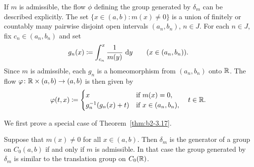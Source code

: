 \begin{remark}\label{rem:b2-3.17}
If\/ $m$ is admissible, the flow $\phi$ defining the group generated by $\delta_{m}$
can be described explicitly.
The set $\{x \in (a,b) : m(x) \neq 0\}$ is a union of finitely or countably many
pairwise disjoint open intervals $(a_{n},b_{n})$, $n \in J$.
For each $n \in J$, fix $c_{n} \in (a_{n},b_{n})$ and set
\[
    g_{n}(x) \coloneq \int_{c_{n}}^{x} \frac{1}{m(y)}\,\mathop{}\!\mathrm{d}{y} \qquad (x \in (a_{n},b_{n})).
\]
Since $m$ is admissible, each $g_{n}$ is a homeomorphism from $(a_{n},b_{n})$ onto $\mathbb{R}$.
The flow $\phi \colon \R \times (a,b) \to (a,b)$ is then given by
\begin{equation}\label{eq:b2-3.22}
    \phi(t,x) \coloneq \begin{cases}
        x                       & \text{if } m(x) = 0, \\
        g_{n}^{-1}(g_{n}(x)+t) & \text{if } x \in (a_{n},b_{n}),
    \end{cases}
    \quad t \in \R.
\end{equation}
\end{remark}
We first prove a special case of Theorem~\ref{thm:b2-3.17}.
\begin{proposition}\label{prop:b2-3.18}
%
Suppose that $m(x) \neq 0$ for all $x \in (a,b)$.
Then $\delta_{m}$ is the generator of a group on $C_{0}(a,b)$ if and only if\/ $m$ is admissible.
In that case the group generated by $\delta_{m}$ is similar to the translation group on $C_{0}(\mathbb{R})$.
\end{proposition}
